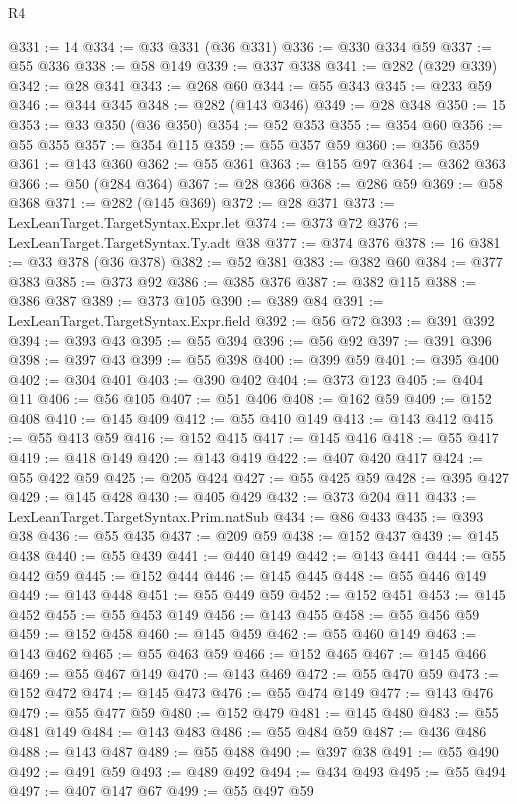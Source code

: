 \begin{lexlean}{R4}
\begin{coremodule}
@331 := 14
@334 := @33 @331 (@36 @331)
@336 := @330 @334 @59
@337 := @55 @336
@338 := @58 @149
@339 := @337 @338
@341 := @282 (@329 @339)
@342 := @28 @341
@343 := @268 @60
@344 := @55 @343
@345 := @233 @59
@346 := @344 @345
@348 := @282 (@143 @346)
@349 := @28 @348
@350 := 15
@353 := @33 @350 (@36 @350)
@354 := @52 @353
@355 := @354 @60
@356 := @55 @355
@357 := @354 @115
@359 := @55 @357 @59
@360 := @356 @359
@361 := @143 @360
@362 := @55 @361
@363 := @155 @97
@364 := @362 @363
@366 := @50 (@284 @364)
@367 := @28 @366
@368 := @286 @59
@369 := @58 @368
@371 := @282 (@145 @369)
@372 := @28 @371
@373 := LexLeanTarget.TargetSyntax.Expr.let
@374 := @373 @72
@376 := LexLeanTarget.TargetSyntax.Ty.adt @38
@377 := @374 @376
@378 := 16
@381 := @33 @378 (@36 @378)
@382 := @52 @381
@383 := @382 @60
@384 := @377 @383
@385 := @373 @92
@386 := @385 @376
@387 := @382 @115
@388 := @386 @387
@389 := @373 @105
@390 := @389 @84
@391 := LexLeanTarget.TargetSyntax.Expr.field
@392 := @56 @72
@393 := @391 @392
@394 := @393 @43
@395 := @55 @394
@396 := @56 @92
@397 := @391 @396
@398 := @397 @43
@399 := @55 @398
@400 := @399 @59
@401 := @395 @400
@402 := @304 @401
@403 := @390 @402
@404 := @373 @123
@405 := @404 @11
@406 := @56 @105
@407 := @51 @406
@408 := @162 @59
@409 := @152 @408
@410 := @145 @409
@412 := @55 @410 @149
@413 := @143 @412
@415 := @55 @413 @59
@416 := @152 @415
@417 := @145 @416
@418 := @55 @417
@419 := @418 @149
@420 := @143 @419
@422 := @407 @420 @417
@424 := @55 @422 @59
@425 := @205 @424
@427 := @55 @425 @59
@428 := @395 @427
@429 := @145 @428
@430 := @405 @429
@432 := @373 @204 @11
@433 := LexLeanTarget.TargetSyntax.Prim.natSub
@434 := @86 @433
@435 := @393 @38
@436 := @55 @435
@437 := @209 @59
@438 := @152 @437
@439 := @145 @438
@440 := @55 @439
@441 := @440 @149
@442 := @143 @441
@444 := @55 @442 @59
@445 := @152 @444
@446 := @145 @445
@448 := @55 @446 @149
@449 := @143 @448
@451 := @55 @449 @59
@452 := @152 @451
@453 := @145 @452
@455 := @55 @453 @149
@456 := @143 @455
@458 := @55 @456 @59
@459 := @152 @458
@460 := @145 @459
@462 := @55 @460 @149
@463 := @143 @462
@465 := @55 @463 @59
@466 := @152 @465
@467 := @145 @466
@469 := @55 @467 @149
@470 := @143 @469
@472 := @55 @470 @59
@473 := @152 @472
@474 := @145 @473
@476 := @55 @474 @149
@477 := @143 @476
@479 := @55 @477 @59
@480 := @152 @479
@481 := @145 @480
@483 := @55 @481 @149
@484 := @143 @483
@486 := @55 @484 @59
@487 := @436 @486
@488 := @143 @487
@489 := @55 @488
@490 := @397 @38
@491 := @55 @490
@492 := @491 @59
@493 := @489 @492
@494 := @434 @493
@495 := @55 @494
@497 := @407 @147 @67
@499 := @55 @497 @59

\end{coremodule}
\end{lexlean}
